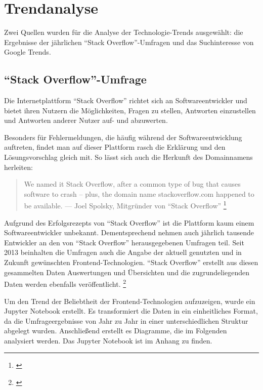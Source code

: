 \section{Trendanalyse}
\label{sec:Trendanalyse}


Zwei Quellen wurden für die Analyse der Technologie-Trends ausgewählt: die Ergebnisse der jährlichen \enquote{Stack Overflow}-Umfragen und das Suchinteresse von Google Trends.

\subsection{\enquote{Stack Overflow}-Umfrage}
Die Internetplattform \enquote{Stack Overflow} richtet sich an Softwareentwickler und bietet ihren Nutzern die Möglichkeiten, Fragen zu stellen, Antworten einzustellen und Antworten anderer Nutzer auf- und abzuwerten.

Besonders für Fehlermeldungen, die häufig während der Softwareentwicklung auftreten, findet man auf dieser Plattform rasch die Erklärung und den Lösungsvorschlag gleich mit.
So lässt sich auch die Herkunft des Domainnamens herleiten:

\begin{quotation}
We named it Stack Overflow, after a common type of bug that causes software to crash -- plus, the domain name stackoverflow.com happened to be available. --- Joel Spolsky, Mitgründer von \enquote{Stack Overflow} \footnote{\cite{TheUnprovenPath}}
\end{quotation}

Aufgrund des Erfolgsrezepts von \enquote{Stack Overflow} ist die Plattform kaum einem Softwareentwickler unbekannt.
Dementsprechend nehmen auch jährlich tausende Entwickler an den von \enquote{Stack Overflow} herausgegebenen Umfragen teil.
Seit  2013 beinhalten die Umfragen auch die Angabe der aktuell genutzten und in Zukunft gewünschten Frontend-Technologien.
\enquote{Stack Overflow} erstellt aus diesen gesammelten Daten Auswertungen und Übersichten und die zugrundeliegenden Daten werden ebenfalls veröffentlicht.
\footnote{\cite{StackOverflowInsights}} 

Um den Trend der Beliebtheit der Frontend-Technologien aufzuzeigen, wurde ein Jupyter Notebook erstellt.
Es transformiert die Daten in ein einheitliches Format, da die  Umfrageergebnisse von Jahr zu Jahr in einer unterschiedlichen Struktur abgelegt wurden.
Anschließend erstellt es Diagramme, die im Folgenden analysiert werden.
Das Jupyter Notebook ist im  Anhang zu finden.


